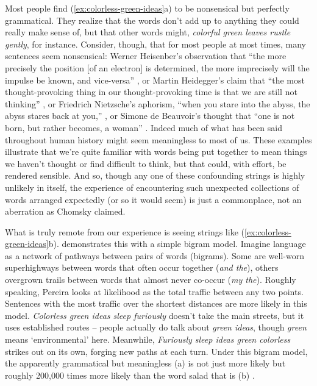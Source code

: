 Most people find (\ref{ex:colorless-green-ideas}a) to be nonsensical but perfectly grammatical. They realize that the words don't add up to anything they could really make sense of, but that other words might, \textit{colorful green leaves rustle gently}, for instance. Consider, though, that for most people at most times, many sentences seem nonsensical: Werner Heisenber's observation that ``the more precisely the position [of an electron] is determined, the more imprecisely will the impulse be known, and vice-versa'' \citep[5]{Heisenberg1927}, or Martin Heidegger's claim that ``the most thought-provoking thing in our thought-provoking time is that we are still not thinking'' \citep{Heidegger1993}, or  Friedrich Nietzsche's aphorism, ``when you stare into the abyss, the abyss stares back at you,'' \citep{NietzscheBeyondGoodAndEvil}, or  Simone de Beauvoir's thought that ``one is not born, but rather becomes, a woman'' \citep{DeBeauvoir1949}. Indeed much of what has been said throughout human history might seem meaningless to most of us. These examples illustrate that we're quite familiar with words being put together to mean things we haven't thought or find difficult to think, but that could, with effort, be rendered sensible. And so, though any one of these confounding strings is highly unlikely in itself, the experience of encountering such unexpected collections of words arranged expectedly (or so it would seem) is just a commonplace, not an aberration as Chomsky claimed.

What is truly remote from our experience is seeing strings like (\ref{ex:colorless-green-ideas}b). \citet{Pereira2000} demonstrates this with a simple bigram model. Imagine language as a network of pathways between pairs of words (bigrams). Some are well-worn superhighways between words that often occur together (\textit{and the}), others overgrown trails between words that almost never co-occur (\textit{my the}). Roughly speaking, Pereira looks at likelihood as the total traffic between any two points. Sentences with the most traffic over the shortest distances are more likely in this model. \textit{Colorless green ideas sleep furiously} doesn't take the main streets, but it uses established routes -- people actually do talk about \textit{green ideas}, though \textit{green} means `environmental' here. Meanwhile, \textit{Furiously sleep ideas green colorless} strikes out on its own, forging new paths at each turn. Under this bigram model, the apparently grammatical but meaningless (a) is not just more likely but roughly 200,000 times more likely than the word salad that is (b) \citep[7]{Pereira2000}.

